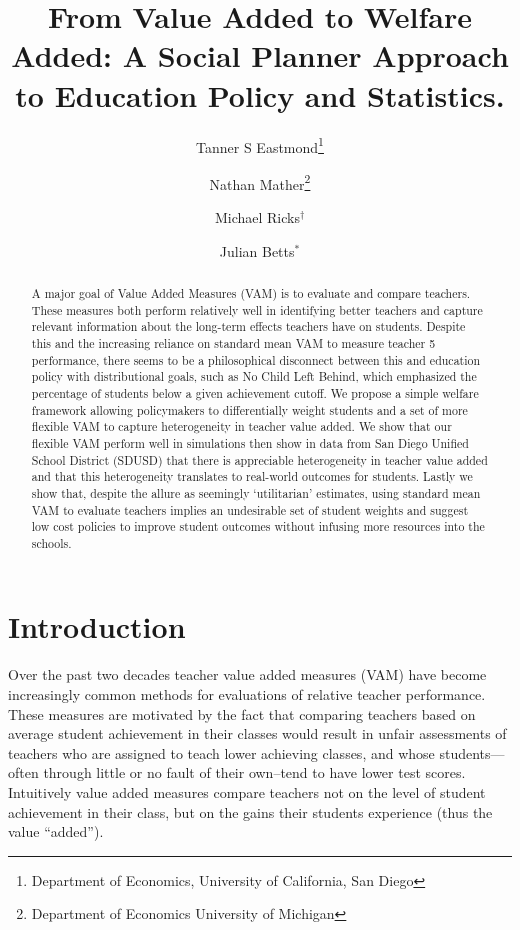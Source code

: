 \documentclass[letterpaper,12pt]{article}
\title{From Value Added to Welfare Added: A Social Planner Approach to Education Policy and Statistics.}
\author{Tanner S Eastmond\thanks{Department of Economics, University of California, San Diego} \and Nathan Mather\thanks{Department of Economics University of Michigan} \and Michael Ricks$^\dagger$ \and Julian Betts$^*$}
\date{\vspace{-8ex}}
\begin{document}
\maketitle





\begin{abstract}
    A major goal of Value Added Measures (VAM) is to evaluate and compare teachers. These measures both perform relatively well in identifying better teachers and capture relevant information about the long-term effects teachers have on students. Despite this and the increasing reliance on standard mean VAM to measure teacher 
5
 performance, there seems to be a philosophical disconnect between this and education policy with distributional goals, such as No Child Left Behind, which emphasized the percentage of students below a given achievement cutoff. We propose a simple welfare framework allowing policymakers to differentially weight students and a set of more flexible VAM to capture heterogeneity in teacher value added. We show that our flexible VAM perform well in simulations then show in data from San Diego Unified School District (SDUSD) that there is appreciable heterogeneity in teacher value added and that this heterogeneity translates to real-world outcomes for students. Lastly we show that, despite the allure as seemingly `utilitarian' estimates, using standard mean VAM to evaluate teachers implies an undesirable set of student weights and suggest low cost policies to improve student outcomes without infusing more resources into the schools.
\end{abstract}





\section{Introduction}

Over the past two decades teacher value added measures (VAM) have become increasingly common methods for evaluations of relative teacher performance. These measures are motivated by the fact that comparing teachers based on average student achievement in their classes would result in unfair assessments of teachers who are assigned to teach lower achieving classes, and whose students---often through little or no fault of their own--tend to have lower test scores. Intuitively value added measures compare teachers not on the level of student achievement in their class, but on the gains their students experience (thus the value ``added'').
\end{document}
